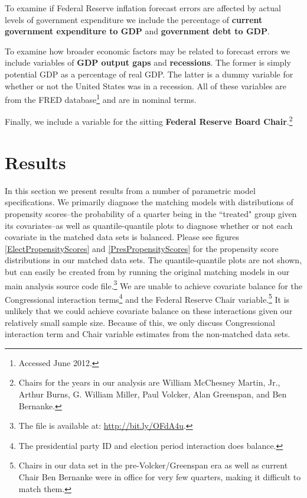 \documentclass[a4paper]{article}\usepackage{graphicx, color}
\begin{document}
To examine if Federal Reserve inflation forecast errors are affected by actual levels of government expenditure we include the percentage of {\bf{current government expenditure to GDP}} and {\bf{government debt to GDP}}. 

To examine how broader economic factors may be related to forecast errors we include variables of {\bf{GDP output gaps}} and {\bf{recessions}}. The former is simply potential GDP as a percentage of real GDP. The latter is a dummy variable for whether or not the United States was in a recession. All of these variables are from the FRED database\footnote{Accessed June 2012.} and are in nominal terms. 

Finally, we include a variable for the sitting {\bf{Federal Reserve Board Chair}}.\footnote{Chairs for the years in our analysis are William McChesney Martin, Jr., Arthur Burns, G. William Miller, Paul Volcker, Alan Greenspan, and Ben Bernanke.}

\section{Results}

In this section we present results from a number of parametric model specifications. We primarily diagnose the matching models with distributions of propensity scores--the probability of a quarter being in the ``treated" group given its covariates--as well as quantile-quantile plots \citep{Ho2007} to diagnose whether or not each covariate in the matched data sets is balanced. Please see figures \ref{ElectPropensityScores} and \ref{PresPropensityScores} for the propensity score distributions in our matched data sets. The quantile-quantile plots are not shown, but can easily be created from by running the original matching models in our main analysis source code file.\footnote{The file is available at: \url{http://bit.ly/OFdA4u}.}  We are unable to achieve covariate balance for the Congressional interaction terms\footnote{The presidential party ID and election period interaction does balance.} and the Federal Reserve Chair variable.\footnote{Chairs in our data set in the pre-Volcker/Greenspan era as well as current Chair Ben Bernanke were in office for very few quarters, making it difficult to match them.} It is unlikely that we could achieve covariate balance on these interactions given our relatively small sample size. Because of this, we only discuss Congressional interaction term and Chair variable estimates from the non-matched data sets.
\end{document}
